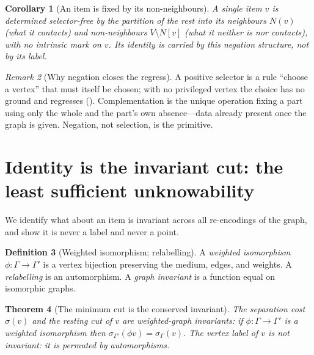 \documentclass[twocolumn,11pt,a4paper]{article}
\theoremstyle{sup}
\newtheorem{theorem}{Theorem}[section]
\newtheorem{corollary}[theorem]{Corollary}
\theoremstyle{definition}
\newtheorem{definition}[theorem]{Definition}
\theoremstyle{remark}
\newtheorem{remark}[theorem]{Remark}
\newcommand{\Gph}{\Gamma}
\newcommand{\V}{V}
\newcommand{\str}{\sigma}
\begin{document}
\begin{corollary}[An item is fixed by its non-neighbours]
\label{cor:nonneighbours}
A single item $v$ is determined selector-free by the partition of the rest into
its neighbours $N(v)$ (what it contacts) and non-neighbours $\V\setminus N[v]$
(what it neither is nor contacts), with no intrinsic mark on $v$. Its identity
is carried by this negation structure, not by its label.
\end{corollary}

\begin{remark}[Why negation closes the regress]
\label{rem:regress}
A positive selector is a rule ``choose a vertex'' that must itself be chosen;
with no privileged vertex the choice has no ground and regresses
(). Complementation is the unique operation fixing a part
using only the whole and the part's own absence---data already present once the
graph is given. Negation, not selection, is the primitive.
\end{remark}

\section{Identity is the invariant cut: the least sufficient unknowability}
\label{sec:identity}

We identify what about an item is invariant across all re-encodings of the
graph, and show it is never a label and never a point.

\begin{definition}[Weighted isomorphism; relabelling]
\label{def:iso}
A \emph{weighted isomorphism} $\phi\colon\Gph\to\Gph'$ is a vertex bijection
preserving the medium, edges, and weights. A \emph{relabelling} is an
automorphism. A \emph{graph invariant} is a function equal on isomorphic graphs.
\end{definition}

\begin{theorem}[The minimum cut is the conserved invariant]
\label{thm:invariant}
The separation cost $\str(v)$ and the resting cut of $v$ are weighted-graph
invariants: if $\phi\colon\Gph\to\Gph'$ is a weighted isomorphism then
$\str_{\Gph'}(\phi v)=\str_\Gph(v)$. The vertex label of $v$ is not invariant: it
is permuted by automorphisms.
\end{theorem}
\end{document}
